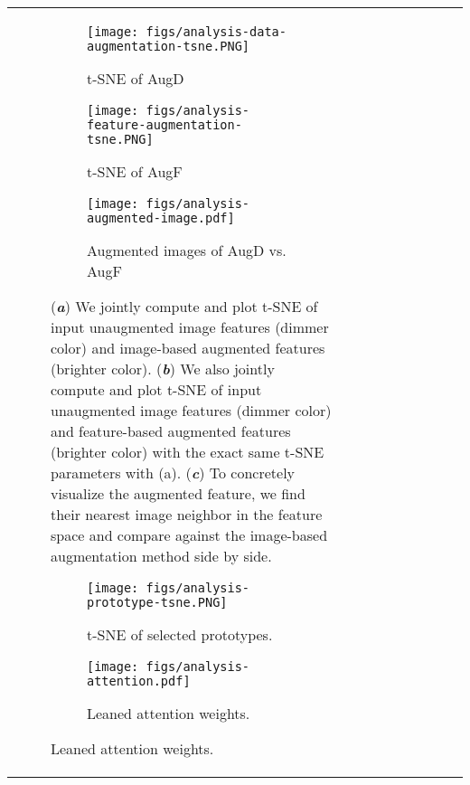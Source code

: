 \documentclass[runningheads]{llncs}
\begin{document}
\begin{table*}[t]
{\begin{tabular}{@{\extracolsep{4pt}}lcccccc@{}}
{\begin{figure}[t]
\centering
\begin{subfigure}{0.51\textwidth}
  \centering
  \texttt{[image: figs/analysis-data-augmentation-tsne.PNG]}
  \caption{t-SNE of AugD}
  \label{fig:analysis-data-augmentation-tsne}
\end{subfigure}
\begin{subfigure}{0.44\textwidth}
  \centering
  \texttt{[image: figs/analysis-feature-augmentation-tsne.PNG]}
  \caption{t-SNE of AugF}
  \label{fig:analysis-feature-augmentation-tsne}
\end{subfigure}

\begin{subfigure}{0.9\textwidth}
  \centering
  \texttt{[image: figs/analysis-augmented-image.pdf]}
  \caption{Augmented images of AugD vs. AugF}
  \label{fig:analysis-augmented-image}
\end{subfigure}
\caption{
(\textit{\textbf{a}}) We jointly compute and plot t-SNE of input unaugmented image features (dimmer color) and image-based augmented features (brighter color).
(\textit{\textbf{b}}) We also jointly compute and plot t-SNE of input unaugmented image features (dimmer color) and feature-based augmented features (brighter color) with the exact same t-SNE parameters with (a).
(\textit{\textbf{c}}) To concretely visualize the augmented feature, we find their nearest image neighbor in the feature space and compare against the image-based augmentation method side by side.
}
\label{fig:analysis-augmentation}
\end{figure}

\begin{figure}[t]
\centering
\begin{subfigure}{0.51\textwidth}
  \centering
  \texttt{[image: figs/analysis-prototype-tsne.PNG]}
  \caption{t-SNE of selected prototypes.}
  \label{fig:analysis-prototype-tsne}
\end{subfigure}
\begin{subfigure}{0.36\textwidth}
  \centering
  \texttt{[image: figs/analysis-attention.pdf]}
  \caption{Leaned attention weights.}
  \label{fig:analysis-attention}
\end{subfigure}


\end{figure}}
\end{tabular}}
\end{table*}
\end{document}
